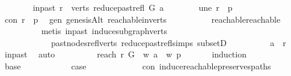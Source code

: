 \begin{isabellebody}
\ \ \ \ \ \ \isamarkupfalse%
\ in{\isacharunderscore}{\kern0pt}past{\isacharcolon}{\kern0pt}\ {\isachardoublequoteopen}r\ {\isasymin}\ verts\ {\isacharparenleft}{\kern0pt}reduce{\isacharunderscore}{\kern0pt}past{\isacharunderscore}{\kern0pt}refl\ G\ a{\isacharparenright}{\kern0pt}{\isachardoublequoteclose}\isanewline
\ \ \ \ \ \ \isamarkupfalse%
\ une{\isacharcolon}{\kern0pt}\ {\isachardoublequoteopen}r\ {\isasymnoteq}\ p{\isachardoublequoteclose}\isanewline
\ \ \ \ \ \ \isamarkupfalse%
\ \isamarkupfalse%
\ con{\isacharcolon}{\kern0pt}\ {\isachardoublequoteopen}r\ {\isasymrightarrow}\isactrlsup {\isacharasterisk}{\kern0pt}\ p{\isachardoublequoteclose}\ \isamarkupfalse%
\ gen\ genesisAlt\ reachable{\isacharunderscore}{\kern0pt}in{\isacharunderscore}{\kern0pt}verts\isanewline
\ \ \ \ \ \ \ \ \ \ reachable{}{\isacharunderscore}{\kern0pt}reachable\isanewline
\ \ \ \ \ \ \ \ \isamarkupfalse%
\ {\isacharparenleft}{\kern0pt}metis\ in{\isacharunderscore}{\kern0pt}past\ induce{\isacharunderscore}{\kern0pt}subgraph{\isacharunderscore}{\kern0pt}verts\isanewline
\ \ \ \ \ \ \ \ \ \ \ \ past{\isacharunderscore}{\kern0pt}nodes{\isacharunderscore}{\kern0pt}refl{\isacharunderscore}{\kern0pt}verts\ reduce{\isacharunderscore}{\kern0pt}past{\isacharunderscore}{\kern0pt}refl{\isachardot}{\kern0pt}simps\ subsetD{\isacharparenright}{\kern0pt}\ \ \isanewline
\ \ \ \ \ \ \isamarkupfalse%
\ {\isachardoublequoteopen}a\ {\isasymrightarrow}\isactrlsup {\isacharasterisk}{\kern0pt}\ r{\isachardoublequoteclose}\ \isamarkupfalse%
\ in{\isacharunderscore}{\kern0pt}past\ \isamarkupfalse%
\ auto\isanewline
\ \ \ \ \ \ \isamarkupfalse%
\ \isamarkupfalse%
\ reach{\isacharcolon}{\kern0pt}\ {\isachardoublequoteopen}r\ {\isasymrightarrow}\isactrlsup {\isacharasterisk}{\kern0pt}\isactrlbsub G\ {\isasymrestriction}\ {\isacharbraceleft}{\kern0pt}w{\isachardot}{\kern0pt}\ a\ {\isasymrightarrow}\isactrlsup {\isacharasterisk}{\kern0pt}\ w{\isacharbraceright}{\kern0pt}\isactrlesub \ p{\isachardoublequoteclose}\isanewline
\ \ \ \ \ \ \isamarkupfalse%
{\isacharparenleft}{\kern0pt}induction{\isacharparenright}{\kern0pt}\isanewline
\ \ \ \ \ \ \ \ \isamarkupfalse%
\ base\isanewline
\ \ \ \ \ \ \ \ \isamarkupfalse%
\ \isamarkupfalse%
\ {\isacharquery}{\kern0pt}case\isanewline
\ \ \ \ \ \ \ \ \ \ \isamarkupfalse%
\ \ con\ induce{\isacharunderscore}{\kern0pt}reachable{\isacharunderscore}{\kern0pt}preserves{\isacharunderscore}{\kern0pt}paths\isanewline

\end{isabellebody}
